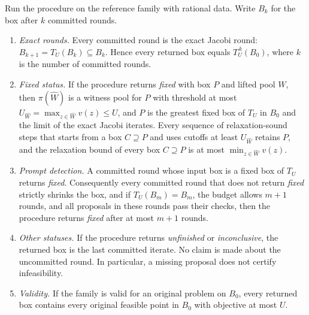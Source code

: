\begin{theorem}\label{thm:closure}
Run the procedure on the reference family with rational data. Write
$B_k$ for the box after $k$ committed rounds.
\begin{enumerate}
\item[(a)] \emph{Exact rounds.} Every committed round is the exact Jacobi
round: $B_{k+1}=T_U(B_k)\subseteq B_k$. Hence every returned box equals
$T_U^{\,k}(B_0)$, where $k$ is the number of committed rounds.
\item[(b)] \emph{Fixed status.} If the procedure returns \emph{fixed} with box
$P$ and lifted pool $\widehat W$, then $\pi(\widehat W)$ is a witness pool for
$P$ with threshold at most $U_{\widehat W}=\max_{z\in\widehat W}v(z)\le U$, and
$P$ is the greatest fixed box of $T_U$ in $B_0$ and the limit of the exact
Jacobi iterates. Every sequence of relaxation-sound steps that starts from a
box $C\supseteq P$ and uses cutoffs at least $U_{\widehat W}$ retains $P$, and
the relaxation bound of every box $C\supseteq P$ is at most
$\min_{z\in\widehat W}v(z)$.
\item[(c)] \emph{Prompt detection.} A committed round whose input box is a
fixed box of $T_U$ returns \emph{fixed}. Consequently every committed round
that does not return \emph{fixed} strictly shrinks the box, and if
$T_U(B_m)=B_m$, the budget allows $m+1$ rounds, and all proposals in these
rounds pass their checks, then the procedure returns \emph{fixed} after at
most $m+1$ rounds.
\item[(d)] \emph{Other statuses.} If the procedure returns \emph{unfinished}
or \emph{inconclusive}, the returned box is the last committed iterate. No
claim is made about the uncommitted round. In particular, a missing proposal
does not certify infeasibility.
\item[(e)] \emph{Validity.} If the family is valid for an original problem on
$B_0$, every returned box contains every original feasible point in $B_0$
with objective at most $U$.
\end{enumerate}
\end{theorem}

